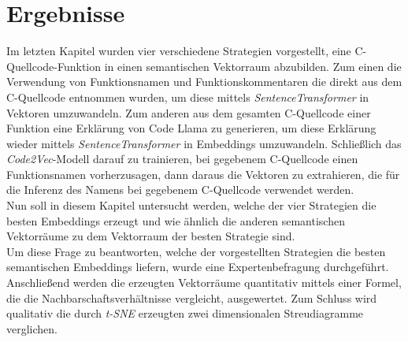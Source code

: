 \documentclass[12pt,letterpaper,ngerman]{article}
\begin{document}
\section{Ergebnisse}
Im letzten Kapitel wurden vier verschiedene Strategien vorgestellt,
eine C-Quellcode-Funktion in einen semantischen Vektorraum abzubilden.
Zum einen die Verwendung von Funktionsnamen und Funktionskommentaren 
die direkt aus dem C-Quellcode entnommen wurden, um diese mittels
\textit{SentenceTransformer} in Vektoren umzuwandeln. Zum anderen
aus dem gesamten C-Quellcode einer
Funktion eine Erklärung von Code Llama zu generieren, um diese 
Erklärung wieder mittels \textit{SentenceTransformer} in Embeddings
umzuwandeln. Schließlich das \textit{Code2Vec}-Modell darauf zu
trainieren,
bei gegebenem C-Quellcode einen Funktionsnamen vorherzusagen, dann 
daraus die Vektoren zu extrahieren, die für die Inferenz des Namens
bei gegebenem C-Quellcode verwendet werden.\\
Nun soll in diesem Kapitel untersucht werden, welche der vier Strategien
die besten Embeddings erzeugt und wie ähnlich die anderen 
semantischen Vektorräume zu dem Vektorraum der besten Strategie
sind.\\
Um diese Frage zu beantworten, welche der vorgestellten Strategien
die besten semantischen Embeddings liefern, wurde eine Expertenbefragung 
durchgeführt. Anschließend werden die erzeugten Vektorräume quantitativ
mittels einer Formel, die die Nachbarschaftsverhältnisse vergleicht, 
ausgewertet.
Zum Schluss wird qualitativ die durch \textit{t-SNE} erzeugten
zwei dimensionalen Streudiagramme verglichen.
\end{document}
